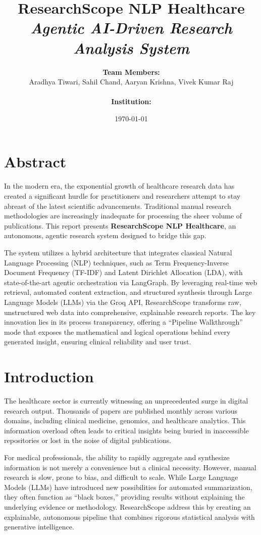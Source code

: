 \documentclass[12pt,a4paper]{article}
\title{
    \Huge \textbf{ResearchScope NLP Healthcare} \\
    \Large \textit{Agentic AI-Driven Research Analysis System}
}
\author{
    \Large \textbf{Team Members:} \\
    Aradhya Tiwari, Sahil Chand, Aaryan Krishna, Vivek Kumar Raj \\
    \vspace{0.5cm} \\
    \textbf{Institution:} \\
    [Your Institution Name]
}
\date{\today}
\begin{document}
\maketitle
\newpage

\tableofcontents
\newpage

\section{Abstract}
In the modern era, the exponential growth of healthcare research data has created a significant hurdle for practitioners and researchers attempt to stay abreast of the latest scientific advancements. Traditional manual research methodologies are increasingly inadequate for processing the sheer volume of publications. This report presents \textbf{ResearchScope NLP Healthcare}, an autonomous, agentic research system designed to bridge this gap.

The system utilizes a hybrid architecture that integrates classical Natural Language Processing (NLP) techniques, such as Term Frequency-Inverse Document Frequency (TF-IDF) and Latent Dirichlet Allocation (LDA), with state-of-the-art agentic orchestration via LangGraph. By leveraging real-time web retrieval, automated content extraction, and structured synthesis through Large Language Models (LLMs) via the Groq API, ResearchScope transforms raw, unstructured web data into comprehensive, explainable research reports. The key innovation lies in its process transparency, offering a ``Pipeline Walkthrough'' mode that exposes the mathematical and logical operations behind every generated insight, ensuring clinical reliability and user trust.

\section{Introduction}
The healthcare sector is currently witnessing an unprecedented surge in digital research output. Thousands of papers are published monthly across various domains, including clinical medicine, genomics, and healthcare analytics. This information overload often leads to critical insights being buried in inaccessible repositories or lost in the noise of digital publications.

For medical professionals, the ability to rapidly aggregate and synthesize information is not merely a convenience but a clinical necessity. However, manual research is slow, prone to bias, and difficult to scale. While Large Language Models (LLMs) have introduced new possibilities for automated summarization, they often function as ``black boxes,'' providing results without explaining the underlying evidence or methodology. ResearchScope address this by creating an explainable, autonomous pipeline that combines rigorous statistical analysis with generative intelligence.
\end{document}
